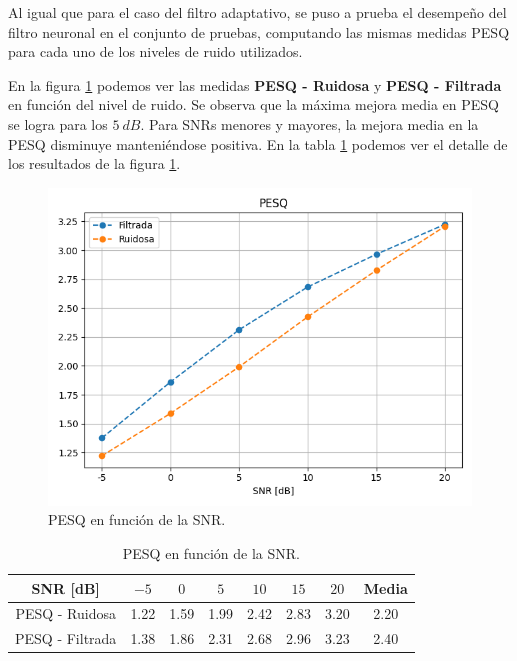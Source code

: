 Al igual que para el caso del filtro adaptativo, se puso a prueba el desempeño del filtro neuronal en el conjunto de pruebas, computando las mismas medidas PESQ para cada uno de los niveles de ruido utilizados. 

En la figura \ref{fig:ch7_pesq_by_snr} podemos ver las medidas \textbf{PESQ - Ruidosa} y \textbf{PESQ - Filtrada} en función del nivel de ruido. Se observa que la máxima mejora media en PESQ se logra para los $\SI{5}{dB}$. Para SNRs menores y mayores, la mejora media en la PESQ disminuye manteniéndose positiva. En la tabla \ref{table:ch7_pesq_by_snr} podemos ver el detalle de los resultados de la figura \ref{fig:ch7_pesq_by_snr}.

\begin{figure}
	\centering
	\centerline{\includegraphics[scale=0.75]{images/ch7/pesq_by_snr.png}}
	\caption{PESQ en función de la SNR.}
	\label{fig:ch7_pesq_by_snr}
\end{figure}

\begin{table}
	\centering
	\begin{tabular}{ |c|c|c|c|c|c|c|c| } 
		\hline
		SNR [dB] & $-5$ & $0$ & $5$ & $10$ & $15$ & $20$ & Media \\ 
		\hline
		PESQ - Ruidosa & 1.22 & 1.59 & 1.99 & 2.42 & 2.83 & 3.20 & 2.20 \\
		PESQ - Filtrada & 1.38 & 1.86 & 2.31 & 2.68 & 2.96 & 3.23 & 2.40 \\
		\hline
	\end{tabular}
	\caption{PESQ en función de la SNR.}
	\label{table:ch7_pesq_by_snr}
\end{table}

